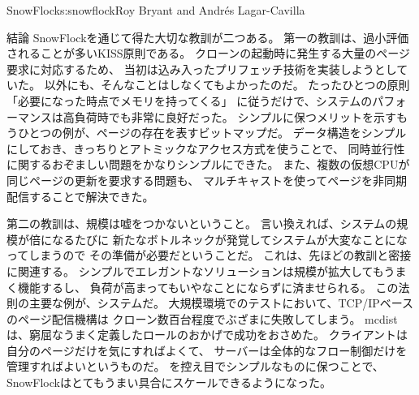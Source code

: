 \begin{aosachapter}{SnowFlock}{s:snowflock}{Roy Bryant and Andr\'e{s} Lagar-Cavilla}
\begin{aosasect1}{結論}
SnowFlockを通じて得た大切な教訓が二つある。
第一の教訓は、過小評価されることが多いKISS原則である。
クローンの起動時に発生する大量のページ要求に対応するため、
当初は込み入ったプリフェッチ技術を実装しようとしていた。
以外にも、そんなことはしなくてもよかったのだ。
たったひとつの原則「必要になった時点でメモリを持ってくる」
に従うだけで、システムのパフォーマンスは高負荷時でも非常に良好だった。
シンプルに保つメリットを示すもうひとつの例が、ページの存在を表すビットマップだ。
データ構造をシンプルにしておき、きっちりとアトミックなアクセス方式を使うことで、
同時並行性に関するおぞましい問題をかなりシンプルにできた。
また、複数の仮想CPUが同じページの更新を要求する問題も、
マルチキャストを使ってページを非同期配信することで解決できた。

第二の教訓は、規模は嘘をつかないということ。
言い換えれば、システムの規模が倍になるたびに
新たなボトルネックが発覚してシステムが大変なことになってしまうので
その準備が必要だということだ。
これは、先ほどの教訓と密接に関連する。
シンプルでエレガントなソリューションは規模が拡大してもうまく機能するし、
負荷が高まってもいやなことにならずに済ませられる。
この法則の主要な例が、システムだ。
大規模環境でのテストにおいて、TCP/IPベースのページ配信機構は
クローン数百台程度でぶざまに失敗してしまう。
mcdistは、窮屈なうまく定義したロールのおかげで成功をおさめた。
クライアントは自分のページだけを気にすればよくて、
サーバーは全体的なフロー制御だけを管理すればよいというものだ。
を控え目でシンプルなものに保つことで、
SnowFlockはとてもうまい具合にスケールできるようになった。


\end{aosasect1}
\end{aosachapter}
